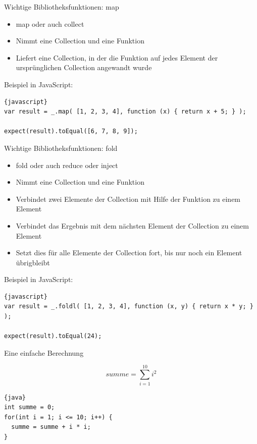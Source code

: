 
\begin{frame}[fragile]{Wichtige Bibliotheksfunktionen: map}
\begin{itemize}
\item map oder auch collect
\item Nimmt eine Collection und eine Funktion
\item Liefert eine Collection, in der die Funktion auf jedes Element der ursprünglichen Collection angewandt wurde
\end{itemize}

Beispiel in JavaScript:
\begin{lstlisting}{javascript}
var result = _.map( [1, 2, 3, 4], function (x) { return x + 5; } );

expect(result).toEqual([6, 7, 8, 9]);
\end{lstlisting}

\end{frame}

\begin{frame}[fragile]{Wichtige Bibliotheksfunktionen: fold}
\begin{itemize}
\item fold oder auch reduce oder inject
\item Nimmt eine Collection und eine Funktion
\item Verbindet zwei Elemente der Collection mit Hilfe der Funktion zu einem Element
\item Verbindet das Ergebnis mit dem nächsten Element der Collection zu einem Element
\item Setzt dies für alle Elemente der Collection fort, bis nur noch ein Element übrigbleibt
\end{itemize}

Beispiel in JavaScript:
\begin{lstlisting}{javascript}
var result = _.foldl( [1, 2, 3, 4], function (x, y) { return x * y; } );

expect(result).toEqual(24);
\end{lstlisting}

\end{frame}

\begin{frame}[fragile]{Eine einfache Berechnung}

\[
summe = \sum_{i=1}^{10}i^2
\]

\vspace{5em}

\begin{lstlisting}{java}
int summe = 0;
for(int i = 1; i <= 10; i++) {
  summe = summe + i * i;
}
\end{lstlisting}
\end{frame}

